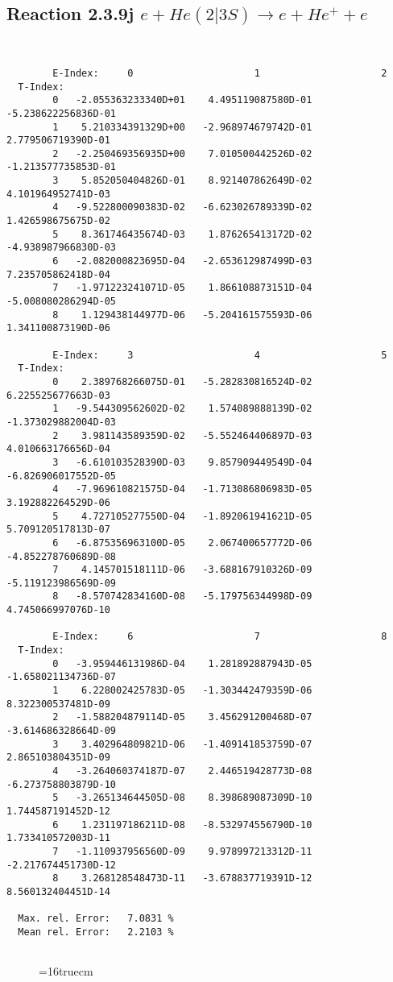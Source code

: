 \documentclass[12pt]{article}
\begin{document}
\subsection{
Reaction 2.3.9j  $e + He(2|3S) \rightarrow e + He^+ + e $
}



\begin{small}\begin{verbatim}


        E-Index:     0                     1                     2
  T-Index:
        0   -2.055363233340D+01    4.495119087580D-01   -5.238622256836D-01
        1    5.210334391329D+00   -2.968974679742D-01    2.779506719390D-01
        2   -2.250469356935D+00    7.010500442526D-02   -1.213577735853D-01
        3    5.852050404826D-01    8.921407862649D-02    4.101964952741D-03
        4   -9.522800090383D-02   -6.623026789339D-02    1.426598675675D-02
        5    8.361746435674D-03    1.876265413172D-02   -4.938987966830D-03
        6   -2.082000823695D-04   -2.653612987499D-03    7.235705862418D-04
        7   -1.971223241071D-05    1.866108873151D-04   -5.008080286294D-05
        8    1.129438144977D-06   -5.204161575593D-06    1.341100873190D-06

        E-Index:     3                     4                     5
  T-Index:
        0    2.389768266075D-01   -5.282830816524D-02    6.225525677663D-03
        1   -9.544309562602D-02    1.574089888139D-02   -1.373029882004D-03
        2    3.981143589359D-02   -5.552464406897D-03    4.010663176656D-04
        3   -6.610103528390D-03    9.857909449549D-04   -6.826906017552D-05
        4   -7.969610821575D-04   -1.713086806983D-05    3.192882264529D-06
        5    4.727105277550D-04   -1.892061941621D-05    5.709120517813D-07
        6   -6.875356963100D-05    2.067400657772D-06   -4.852278760689D-08
        7    4.145701518111D-06   -3.688167910326D-09   -5.119123986569D-09
        8   -8.570742834160D-08   -5.179756344998D-09    4.745066997076D-10

        E-Index:     6                     7                     8
  T-Index:
        0   -3.959446131986D-04    1.281892887943D-05   -1.658021134736D-07
        1    6.228002425783D-05   -1.303442479359D-06    8.322300537481D-09
        2   -1.588204879114D-05    3.456291200468D-07   -3.614686328664D-09
        3    3.402964809821D-06   -1.409141853759D-07    2.865103804351D-09
        4   -3.264060374187D-07    2.446519428773D-08   -6.273758803879D-10
        5   -3.265134644505D-08    8.398689087309D-10    1.744587191452D-12
        6    1.231197186211D-08   -8.532974556790D-10    1.733410572003D-11
        7   -1.110937956560D-09    9.978997213312D-11   -2.217674451730D-12
        8    3.268128548473D-11   -3.678837719391D-12    8.560132404451D-14

  Max. rel. Error:   7.0831 %
  Mean rel. Error:   2.2103 %


\end{verbatim}\end{small}
\begin{figure} \label{2.3.9j}
\epsfxsize=16truecm
\end{figure}
\newpage
\end{document}
